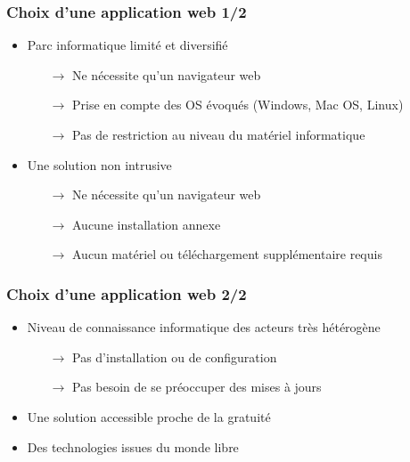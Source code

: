 \begin{frame}
  \frametitle{Choix d'une application web 1/2}
  \begin{itemize}
    \item Parc informatique limité et diversifié
      \begin{itemize}
        \item[$\rightarrow $] Ne nécessite qu'un navigateur web
        \item[$\rightarrow $] Prise en compte des OS évoqués (Windows, Mac OS, Linux)
        \item[$\rightarrow $] Pas de restriction au niveau du matériel informatique
      \end{itemize}
    \item Une solution non intrusive
      \begin{itemize}
        \item[$\rightarrow $] Ne nécessite qu'un navigateur web
        \item[$\rightarrow $] Aucune installation annexe
        \item[$\rightarrow $] Aucun matériel ou téléchargement supplémentaire requis
      \end{itemize}
\end{itemize}
\end{frame}

\begin{frame}
  \frametitle{Choix d'une application web 2/2}
  \begin{itemize}
    \item Niveau de connaissance informatique des acteurs très hétérogène
      \begin{itemize}
        \item[$\rightarrow $] Pas d'installation ou de configuration
        \item[$\rightarrow $] Pas besoin de se préoccuper des mises à jours
      \end{itemize}
    \item Une solution accessible proche de la gratuité
    \item Des technologies issues du monde libre
  \end{itemize}
\end{frame}

